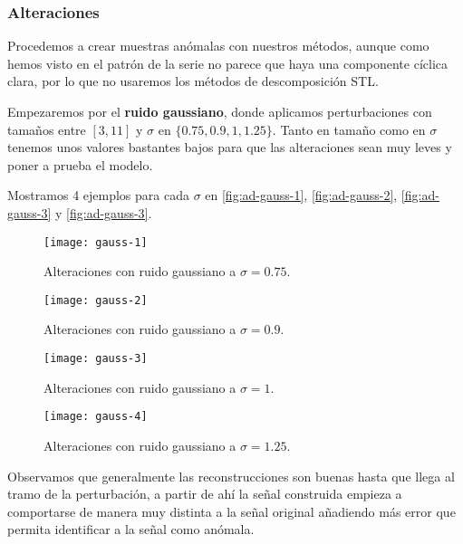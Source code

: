 \subsubsection{Alteraciones}

Procedemos a crear muestras anómalas con nuestros métodos, aunque como hemos visto en el patrón de la serie no parece que haya una componente cíclica clara, por lo que no usaremos los métodos de descomposición STL.

Empezaremos por el \textbf{ruido gaussiano}, donde aplicamos perturbaciones con tamaños entre $[3, 11]$ y $\sigma$ en $\{0.75, 0.9, 1, 1.25\}$. Tanto en tamaño como en $\sigma$ tenemos unos valores bastantes bajos para que las alteraciones sean muy leves y poner a prueba el modelo.

Mostramos 4 ejemplos para cada $\sigma$ en \autoref{fig:ad-gauss-1}, \autoref{fig:ad-gauss-2}, \autoref{fig:ad-gauss-3} y \autoref{fig:ad-gauss-3}.

\begin{figure}[htpb]
  \centering
  \texttt{[image: gauss-1]}
  \caption{Alteraciones con ruido gaussiano a $\sigma = 0.75$.}
  \label{fig:ad-gauss-1}
\end{figure}

\begin{figure}[htpb]
  \centering
  \texttt{[image: gauss-2]}
  \caption{Alteraciones con ruido gaussiano a $\sigma = 0.9$.}
  \label{fig:ad-gauss-2}
\end{figure}

\begin{figure}[htpb]
  \centering
  \texttt{[image: gauss-3]}
  \caption{Alteraciones con ruido gaussiano a $\sigma = 1$.}
  \label{fig:ad-gauss-3}
\end{figure}

\begin{figure}[htpb]
  \centering
  \texttt{[image: gauss-4]}
  \caption{Alteraciones con ruido gaussiano a $\sigma = 1.25$.}
  \label{fig:ad-gauss-4}
\end{figure}

Observamos que generalmente las reconstrucciones son buenas hasta que llega al tramo de la perturbación, a partir de ahí la señal construida empieza a comportarse de manera muy distinta a la señal original añadiendo más error que permita identificar a la señal como anómala.

